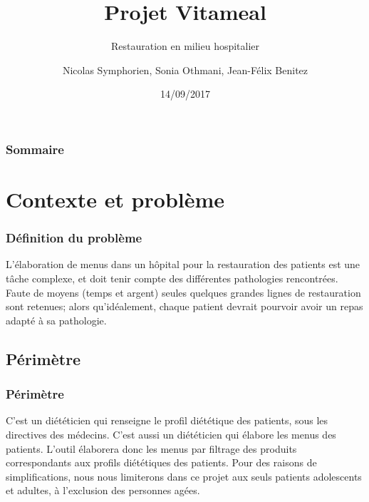 \documentclass{beamer}
\title{Projet Vitameal}
\subtitle{Restauration en milieu hospitalier}
\author{Nicolas Symphorien, Sonia Othmani, Jean-Félix Benitez} %
\institute{CNAM}
\date{14/09/2017}
\begin{document}
\begin{frame}[plain]
  \titlepage
\end{frame}

\begin{frame}
  \frametitle{Sommaire}
  \tableofcontents
\end{frame}

\section{Contexte et problème}
\begin{frame}[label=definitionDuProbleme]
\frametitle{Définition du problème}
L'élaboration de menus dans un hôpital pour la restauration des patients
est une tâche complexe, et doit tenir compte des différentes pathologies
rencontrées. Faute de moyens (temps et argent) seules quelques grandes
lignes de restauration sont retenues; alors qu'idéalement, chaque
patient devrait pourvoir avoir un repas adapté à sa pathologie.
\end{frame}


\subsection{Périmètre}
\begin{frame}[label=perimetre]
\frametitle{Périmètre}
C'est un diététicien qui renseigne le profil diététique des patients,
sous les directives des médecins. C'est aussi un diététicien qui élabore
les menus des patients. L'outil élaborera donc
les menus par filtrage des produits correspondants aux profils
diététiques des patients. Pour des raisons de simplifications, nous nous limiterons dans ce projet aux seuls patients adolescents et adultes, à l'exclusion des personnes agées.
\end{frame}
\end{document}
